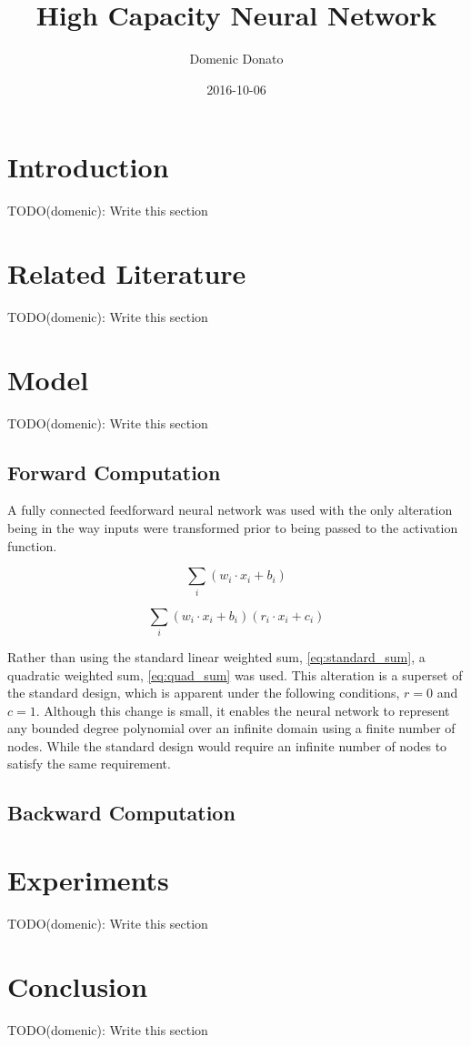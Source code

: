 \documentclass{article}
\title{High Capacity Neural Network}
\date{2016-10-06}
\author{Domenic Donato}
\begin{document}
\maketitle
\newpage
{} 

\section{Introduction}

TODO(domenic): Write this section

\section{Related Literature}

TODO(domenic): Write this section

\section{Model}

TODO(domenic): Write this section

\subsection{Forward Computation}

A fully connected feedforward neural network was used with the only alteration being in the way inputs were transformed prior to being passed to the activation function.

\begin{equation} \label{eq:standard_sum}
\sum_i (w_i \cdot x_i + b_i)
\end{equation}

\begin{equation} \label{eq:quad_sum}
\sum_i (w_i \cdot x_i + b_i)(r_i \cdot x_i + c_i)
\end{equation}

Rather than using the standard linear weighted sum, \eqref{eq:standard_sum}, a quadratic weighted sum, \eqref{eq:quad_sum} was used. This alteration is a superset of the standard design, which is apparent under the following conditions, $r = 0$ and $c = 1$. Although this change is small, it enables the neural network to represent any bounded degree polynomial over an infinite domain using a finite number of nodes. While the standard design would require an infinite number of nodes to satisfy the same requirement.

\subsection{Backward Computation}

\section{Experiments}

TODO(domenic): Write this section

\section{Conclusion}

TODO(domenic): Write this section
\end{document}
